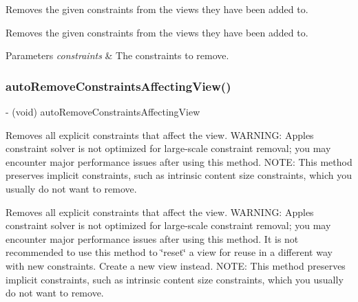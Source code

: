 Removes the given constraints from the views they have been added to.

Removes the given constraints from the views they have been added to.


\begin{DoxyParams}{Parameters}
{\em constraints} & The constraints to remove. \\
\hline
\end{DoxyParams}
\mbox{\label{category_u_i_view_07_auto_layout_08_ac0578df2fe05c1ae5170f286a18026e2}} 
\subsubsection{\texorpdfstring{auto\+Remove\+Constraints\+Affecting\+View()}{autoRemoveConstraintsAffectingView()}}
{\footnotesize\ttfamily -\/ (void) auto\+Remove\+Constraints\+Affecting\+View \begin{DoxyParamCaption}{ }\end{DoxyParamCaption}}

Removes all explicit constraints that affect the view. W\+A\+R\+N\+I\+NG\+: Apple\textquotesingle{}s constraint solver is not optimized for large-\/scale constraint removal; you may encounter major performance issues after using this method. N\+O\+TE\+: This method preserves implicit constraints, such as intrinsic content size constraints, which you usually do not want to remove.

Removes all explicit constraints that affect the view. W\+A\+R\+N\+I\+NG\+: Apple\textquotesingle{}s constraint solver is not optimized for large-\/scale constraint removal; you may encounter major performance issues after using this method. It is not recommended to use this method to \char`\"{}reset\char`\"{} a view for reuse in a different way with new constraints. Create a new view instead. N\+O\+TE\+: This method preserves implicit constraints, such as intrinsic content size constraints, which you usually do not want to remove. \mbox{\label{category_u_i_view_07_auto_layout_08_a535a5949342ded134320b284ad29928b}} 
